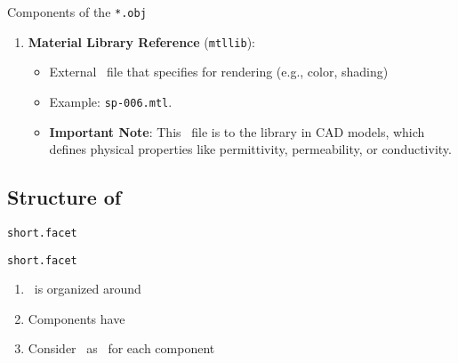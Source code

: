 \begin{frame}{Components of the \texttt{*.obj}}
    \begin{enumerate}
         \setcounter{enumi}{\value{listnumber}}
        \item \textbf{Material Library Reference} (\texttt{mtllib}):

        \begin{itemize}
        		\item External \mtl \ file that specifies  for rendering (e.g., color, shading) %
        		\item Example: \texttt{sp-006.mtl}.
        		\item \textbf{Important Note}:  
              	This \mtl \ file is  to the  library in CAD models, which defines physical properties like permittivity, permeability, or conductivity.%
    \end{itemize}
    \end{enumerate}
\end{frame}

\renewcommand{\listingFontSize}{\scriptsize} 
\subsection{Structure of \facet}
\begin{frame}{\texttt{short.facet}}
        \lstset{style=obj} %
\end{frame}

\begin{frame}{\texttt{short.facet}}
\begin{enumerate}
	\item \facet \ is organized around 
	\item Components have  
	\item Consider \facet \ as \obj \ for each component
\end{enumerate}
\end{frame}

